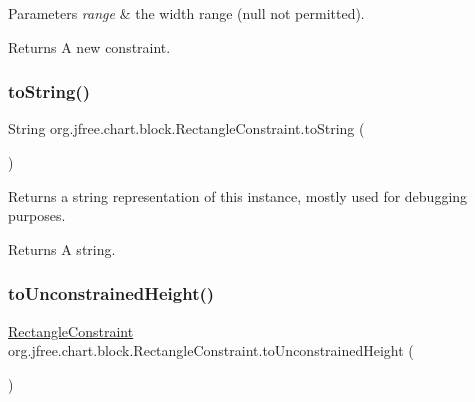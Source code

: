 \begin{DoxyParams}{Parameters}
{\em range} & the width range ({\ttfamily null} not permitted).\\
\hline
\end{DoxyParams}
\begin{DoxyReturn}{Returns}
A new constraint. 
\end{DoxyReturn}
\mbox{\label{classorg_1_1jfree_1_1chart_1_1block_1_1_rectangle_constraint_a09892b7a3bbe624ed9a8fff4fbb146ff}} 
\subsubsection{\texorpdfstring{to\+String()}{toString()}}
{\footnotesize\ttfamily String org.\+jfree.\+chart.\+block.\+Rectangle\+Constraint.\+to\+String (\begin{DoxyParamCaption}{ }\end{DoxyParamCaption})}

Returns a string representation of this instance, mostly used for debugging purposes.

\begin{DoxyReturn}{Returns}
A string. 
\end{DoxyReturn}
\mbox{\label{classorg_1_1jfree_1_1chart_1_1block_1_1_rectangle_constraint_adbdada08d37b628112e03c880db6e350}} 
\subsubsection{\texorpdfstring{to\+Unconstrained\+Height()}{toUnconstrainedHeight()}}
{\footnotesize\ttfamily \mbox{\hyperlink{classorg_1_1jfree_1_1chart_1_1block_1_1_rectangle_constraint}{Rectangle\+Constraint}} org.\+jfree.\+chart.\+block.\+Rectangle\+Constraint.\+to\+Unconstrained\+Height (\begin{DoxyParamCaption}{ }\end{DoxyParamCaption})}

